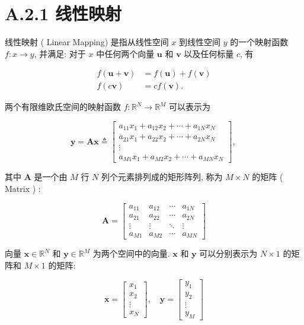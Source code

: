 \documentclass[10pt]{article}
\begin{document}
\section*{A.2.1 线性映射}
线性映射 ( Linear Mapping) 是指从线性空间 $x$ 到线性空间 $y$ 的一个映射函数 $f: x \rightarrow y$, 并满足: 对于 $x$ 中任何两个向量 $\boldsymbol{u}$ 和 $\boldsymbol{v}$ 以及任何标量 $c$, 有


\begin{align*}
f(\boldsymbol{u}+\boldsymbol{v}) & =f(\boldsymbol{u})+f(\boldsymbol{v})  \tag{A.15}\\
f(c \boldsymbol{v}) & =c f(\boldsymbol{v}) . \tag{A.16}
\end{align*}


两个有限维欧氏空间的映射函数 $f: \mathbb{R}^{N} \rightarrow \mathbb{R}^{M}$ 可以表示为

\[
\boldsymbol{y}=\boldsymbol{A} \boldsymbol{x} \triangleq\left[\begin{array}{c}
a_{11} x_{1}+a_{12} x_{2}+\cdots+a_{1 N} x_{N}  \tag{A.17}\\
a_{21} x_{1}+a_{22} x_{2}+\cdots+a_{2 N} x_{N} \\
\vdots \\
a_{M 1} x_{1}+a_{M 2} x_{2}+\cdots+a_{M N} x_{N}
\end{array}\right] \text {, }
\]

其中 $\boldsymbol{A}$ 是一个由 $M$ 行 $N$ 列个元素排列成的矩形阵列, 称为 $M \times N$ 的矩阵 ( Matrix ) :

\[
\boldsymbol{A}=\left[\begin{array}{cccc}
a_{11} & a_{12} & \cdots & a_{1 N}  \tag{A.18}\\
a_{21} & a_{22} & \cdots & a_{2 N} \\
\vdots & \vdots & \ddots & \vdots \\
a_{M 1} & a_{M 2} & \cdots & a_{M N}
\end{array}\right]
\]

向量 $\boldsymbol{x} \in \mathbb{R}^{N}$ 和 $\boldsymbol{y} \in \mathbb{R}^{M}$ 为两个空间中的向量. $\boldsymbol{x}$ 和 $\boldsymbol{y}$ 可以分别表示为 $N \times 1$ 的矩阵和 $M \times 1$ 的矩阵:

\[
\boldsymbol{x}=\left[\begin{array}{c}
x_{1}  \tag{A.19}\\
x_{2} \\
\vdots \\
x_{N}
\end{array}\right], \quad \boldsymbol{y}=\left[\begin{array}{c}
y_{1} \\
y_{2} \\
\vdots \\
y_{M}
\end{array}\right]
\]
\end{document}
